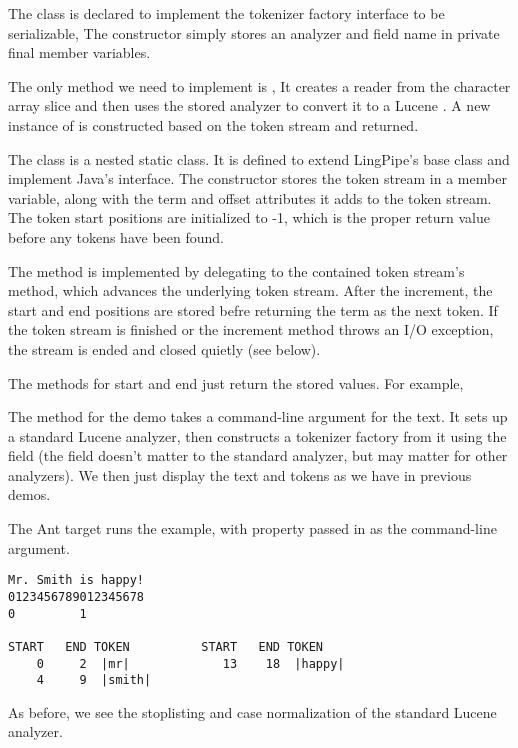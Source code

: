 The class is declared to implement the tokenizer factory interface to
be serializable,
%
%
The constructor simply stores an analyzer and field name in private
final member variables.

The only method we need to implement is ,
%
%
It creates a reader from the character array slice and then uses the
stored analyzer to convert it to a Lucene .  A
new instance of  is constructed based
on the token stream and returned.

The  class is a nested static class.
It is defined to extend LingPipe's  base class and
implement Java's  interface.
%
%
The constructor stores the token stream in a member variable, along
with the term and offset attributes it adds to the token stream.
The token start positions are initialized to -1, which is the proper
return value before any tokens have been found.

The  method is implemented by delegating to the
contained token stream's  method, which
advances the underlying token stream.  
%
After the increment, the start
and end positions are stored befre returning the term as the next
token.  If the token stream is finished or the increment method throws
an I/O exception, the stream is ended and closed quietly (see below).
%

The methods for start and end just return the stored
values.  For example,
%

The  method for the demo takes a command-line argument
for the text.  It sets up a standard Lucene analyzer, then constructs
a tokenizer factory from it using the field  (the field
doesn't matter to the standard analyzer, but may matter for other
analyzers).  
%
%
We then just display the text and tokens as we have in
previous demos.

The Ant target  runs the example, with
property  passed in as the command-line argument.
%
\begin{verbatim}
Mr. Smith is happy!
0123456789012345678
0         1

START   END TOKEN          START   END TOKEN
    0     2  |mr|             13    18  |happy|
    4     9  |smith|
\end{verbatim}
%
As before, we see the stoplisting and case normalization of
the standard Lucene analyzer.


